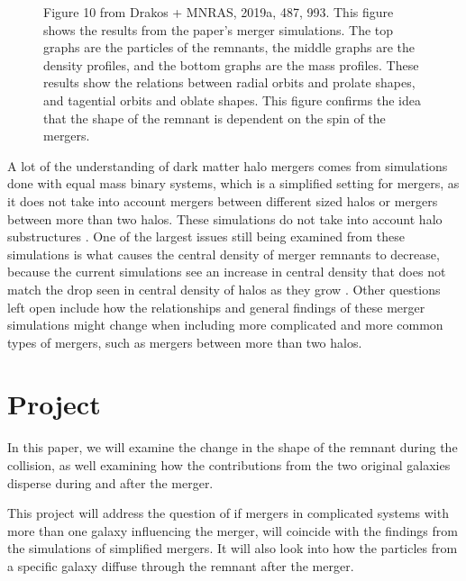 \documentclass[linenumbers,trackchanges]{aastex7}
\begin{document}
\begin{figure}[ht!]
\caption{Figure 10 from Drakos + MNRAS, 2019a, 487, 993. This figure shows the results from the paper's merger simulations. The top graphs are the particles of the remnants, the middle graphs are the density profiles, and the bottom graphs are the mass profiles. These results show the relations between radial orbits and prolate shapes, and tagential orbits and oblate shapes. This figure confirms the idea that the shape of the remnant is dependent on the spin of the mergers.
\label{fig:general}}
\end{figure}



A lot of the understanding of dark matter halo mergers comes from simulations done with equal mass binary systems, which is a simplified setting for mergers, as it does not take into account mergers between different sized halos or mergers between more than two halos. These simulations do not take into account halo substructures \cite{2019MNRAS.487..993D}. One of the largest issues still being examined from these simulations is what causes the central density of merger remnants to decrease, because the current simulations see an increase in central density that does not match the drop seen in central density of halos as they grow \cite{2019MNRAS.487.1008D}. Other questions left open include how the relationships and general findings of these merger simulations might change when including more complicated and more common types of mergers, such as mergers between more than two halos. 


\section{Project} \label{sec:style}

In this paper, we will examine the change in the shape of the remnant during the collision, as well examining how the contributions from the two original galaxies disperse during and after the merger. 

This project will address the question of if mergers in complicated systems with more than one galaxy influencing the merger, will coincide with the findings from the simulations of simplified mergers. It will also look into how the particles from a specific galaxy diffuse through the remnant after the merger. 
\end{document}
